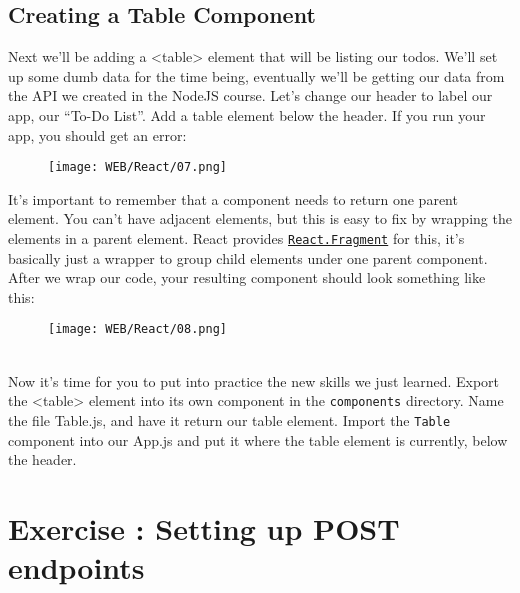 \documentclass{42-en}
\begin{document}
\section{Creating a Table Component}
Next we’ll be adding a <table> element that will be listing our todos. We’ll set up some dumb data for the time being, eventually we’ll be getting our data from the API we created in the NodeJS course. Let’s change our header to label our app, our “To-Do List”. Add a table element below the header. If you run your app, you should get an error:
\begin{figure}[H]
    \begin{center}
        \texttt{[image: WEB/React/07.png]}
    \end{center}
\end{figure}
It’s important to remember that a component needs to return one parent element. You can’t have adjacent elements, but this is easy to fix by wrapping the elements in a parent element. React provides \href{https://reactjs.org/docs/fragments.html}{\texttt{React.Fragment}} for this, it’s basically just a wrapper to group child elements under one parent component. After we wrap our code, your resulting component should look something like this:
\begin{figure}[H]
    \begin{center}
        \texttt{[image: WEB/React/08.png]}
    \end{center}
\end{figure}
~\\
Now it’s time for you to put into practice the new skills we just learned. Export the <table> element into its own component in the \texttt{components} directory. Name the file Table.js, and have it return our table element. Import the \texttt{Table} component into our App.js and put it where the table element is currently, below the header.
\nextexercice

\chapter{Exercise \exercicenumber: Setting up POST endpoints}
\end{document}
